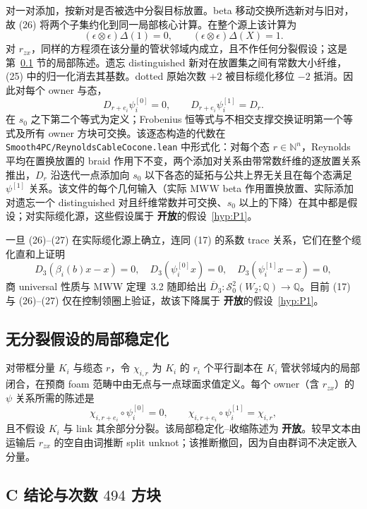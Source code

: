 \documentclass[11pt]{amsart}
\theoremstyle{definition}
\theoremstyle{remark}
\newcommand{\Q}{\mathbb{Q}}
\newcommand{\Open}{\textbf{开放}}
\begin{document}
对一对添加，按新对是否被选中分裂目标放置。beta 移动交换所选新对与旧对，故 (26) 将两个子集约化到同一局部核心计算。在整个源上该计算为
\[
(\epsilon\otimes\epsilon)\Delta(1)=0,\qquad
(\epsilon\otimes\epsilon)\Delta(X)=1.
\]
对 $r_{zx}$，同样的方程须在该分量的管状邻域内成立，且不作任何分裂假设；这是第~\ref{sec:local-stabilization} 节的局部陈述。遗忘 distinguished 新对在放置集之间有常数大小纤维，(25) 中的归一化消去其基数。dotted 原始次数 $+2$ 被目标缆化移位 $-2$ 抵消。因此对每个 owner 与态，
\[
D_{r+e_i}\psi_i^{[0]}=0,\qquad
D_{r+e_i}\psi_i^{[1]}=D_r.
\tag{27}
\]
在 $s_0$ 之下第二个等式为定义；Frobenius 恒等式与不相交支撑交换证明第一个等式及所有 owner 方块可交换。该逐态构造的代数在 \texttt{Smooth4PC/ReynoldsCableCocone.lean} 中形式化：对每个态 $r\in\mathbb N^n$，Reynolds 平均在置换放置的 braid 作用下不变，两个添加对关系由带常数纤维的逐放置关系推出，$D_r$ 沿迭代一点添加向 $s_0$ 以下各态的延拓与公共上界无关且在每个态满足 $\psi^{[1]}$ 关系。该文件的每个几何输入（实际 MWW beta 作用置换放置、实际添加对遗忘一个 distinguished 对且纤维常数并可交换、$s_0$ 以上的下降）在其中都是假设；对实际缆化源，这些假设属于 \Open 的假设~\ref{hyp:P1}。

一旦 (26)--(27) 在实际缆化源上确立，连同 (17) 的系数 trace 关系，它们在整个缆化直和上证明
\[
D_3(\beta_i(b)x-x)=0,\quad
D_3(\psi_i^{[0]}x)=0,\quad
D_3(\psi_i^{[1]}x-x)=0,
\]
商 universal 性质与 MWW 定理~3.2 随即给出 $\overline D_3:\mathcal S^2_0(W_2;\Q)\to\Q$。目前 (17) 与 (26)--(27) 仅在控制领圈上验证，故该下降属于 \Open 的假设~\ref{hyp:P1}。

\subsection{无分裂假设的局部稳定化}
\label{sec:local-stabilization}

对带框分量 $K_i$ 与缆态 $r$，令 $\chi_{i,r}$ 为 $K_i$ 的 $r_i$ 个平行副本在 $K_i$ 管状邻域内的局部闭合，在预商 foam 范畴中由无点与一点球面求值定义。每个 owner（含 $r_{zx}$）的 $\psi$ 关系所需的陈述是
\[
\chi_{i,r+e_i}\circ\psi_i^{[0]}=0,\qquad
\chi_{i,r+e_i}\circ\psi_i^{[1]}=\chi_{i,r},
\]
且不假设 $K_i$ 与 link 其余部分分裂。该局部稳定化--收缩陈述为 \Open。较早文本由运输后 $r_{zx}$ 的空自由词推断 split unknot；该推断撤回，因为自由群词不决定嵌入分量。

\subsection{C 结论与次数 $494$ 方块}
\end{document}
